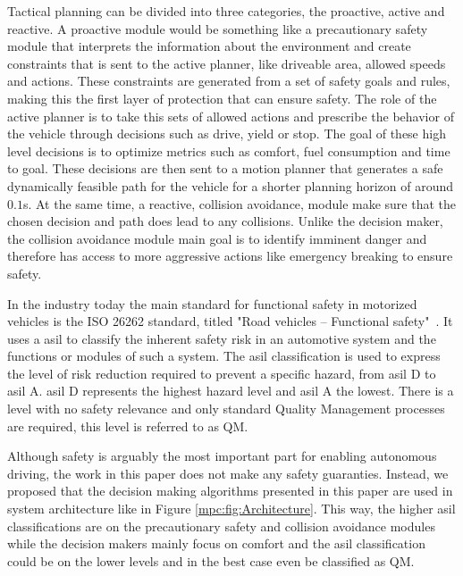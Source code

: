 Tactical planning can be divided into three categories, the proactive, active and reactive. A proactive module would be something like a precautionary safety module that interprets the information about the environment and create constraints that is sent to the active planner, like  driveable area, allowed speeds and actions. These constraints are generated from a set of safety goals and rules, making this the first layer of protection that can ensure safety. 
The role of the active planner is to take this sets of allowed actions and prescribe the behavior of the vehicle through decisions such as drive, yield or stop. The goal of these high level decisions is to optimize metrics such as comfort, fuel consumption and time to goal. These decisions are then sent to a motion planner that generates a safe dynamically feasible path for the vehicle for a shorter planning horizon of around $0.1$s. 
At the same time, a reactive, collision avoidance, module make sure that the chosen decision and path does lead to any collisions. Unlike the decision maker, the collision avoidance module main goal is to identify imminent danger and therefore has access to more aggressive actions like emergency breaking to ensure safety. 
 
In the industry today the main standard for functional safety in motorized vehicles is the ISO 26262 standard, titled "Road vehicles – Functional safety"~\cite{ISO26262}. It uses a \gls{asil} to classify the inherent safety risk in an automotive system and the functions or modules of such a system. The \gls{asil} classification is used to express the level of risk reduction required to prevent a specific hazard, from \gls{asil} D to \gls{asil} A. \gls{asil} D represents the highest hazard level and \gls{asil} A the lowest. There is a level with no safety relevance and only standard Quality Management processes are required, this level is referred to as QM.

Although safety is arguably the most important part for enabling autonomous driving, the work in this paper does not make any safety guaranties. 
Instead, we proposed that the decision making algorithms presented in this paper are used in system architecture like in Figure \ref{mpc:fig:Architecture}. This way, the higher \gls{asil} classifications are on the precautionary safety and collision avoidance modules while the decision makers mainly focus on comfort and the \gls{asil} classification could be on the lower levels and in the best case even be classified as QM.


